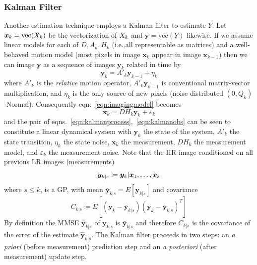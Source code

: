 \subsubsection{Kalman Filter}
Another estimation technique employs a Kalman filter\cite{elad1999} to estimate \(Y\).
%
Let \(\bm{x}_k = \text{vec}(X_k)\) be the vectorization of \(X_k\) and \(\bm{y} = \text{vec}(Y)\) likewise.
%
If we assume linear models for each of \(D, A_k, H_k\) (i.e.,all representable as matrices) and a well-behaved motion model (most pixels in image \(\bm{x}_k\) appear in image \(\bm{x}_{k-1}\)) then we can image \(\bm{y}\) as a sequence of images \(\bm{y}_k\) related in time by
\begin{equation}
    \bm{y}_k = A'_k \bm{y}_{k-1} + \eta_k
    \label{eqn:kalmanprocess}
\end{equation}
%
where \(A'_k\) is the \textit{relative} motion operator, \(A'_k\bm{y}_{k-1}\) is conventional matrix-vector multiplication, and \(\eta_k\) is the only source of new pixels (noise distributed \((0, Q_k)\)-Normal).
%
Consequently eqn.~\eqref{eqn:imagingmodel} becomes
\begin{equation}
    \bm{x}_k = DH_k\bm{y}_k + \varepsilon_k
    \label{eqn:kalmanobs}
\end{equation}
and the pair of eqns.~\eqref{eqn:kalmanprocess},~\eqref{eqn:kalmanobs} can be seen to constitute a linear dynamical system with \(\bm{y}_k\) the state of the system, \(A'_k\) the state transition, \(\eta_k\) the state noise, \(\bm{x}_k\) the measurement, \(DH_k\) the measurement model, and \(\varepsilon_k\) the measurement noise.
%
Note that the HR image conditioned on all previous LR images (measurements)
\begin{equation}
    \bm{y}_{k|s} \coloneqq \bm{y}_k|\bm{x}_1, \mathellipsis, \bm{x}_s
\end{equation}
where \(s \leq k\), is a GP, with mean \(\bar{\bm{y}}_{k|s} = E\left[\bm{y}_{k|s}\right]\)
and covariance
\begin{equation}
    C_{k|s} \coloneqq E\left[ (\bm{y}_k - \bar{\bm{y}}_{k|s})(\bm{y}_k - \bar{\bm{y}}_{k|s})^T  \right]
\end{equation}
%
By definition the MMSE \(\hat{\bm{y}}_{k|s}\) of \(\bm{y}_{k|s}\) is \(\bar{\bm{y}}_{k|s}\) and therefore \(C_{k|s}\) is the covariance of the error of the estimate \(\hat{\bm{y}}_{k|s}\).
%
The Kalman filter proceeds in two steps: an \textit{a priori} (before measurement) prediction step and an \textit{a posteriori} (after measurement) update step.
%
